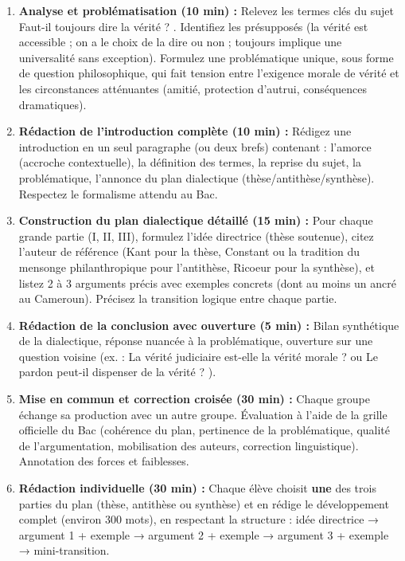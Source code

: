 \documentclass[11pt]{article}
\newcommand{\cle}[1]{{\popxbold\color{popdark}#1}}
\begin{document}
\begin{enumerate}
    \item \textbf{Analyse et problématisation (10 min) :} Relevez les termes clés du sujet \guillemotleft Faut-il toujours dire la vérité ? \guillemotright. Identifiez les présupposés (la vérité est accessible ; on a le choix de la dire ou non ; \guillemotleft toujours \guillemotright implique une universalité sans exception). Formulez une \cle{problématique} unique, sous forme de question philosophique, qui fait tension entre l'exigence morale de vérité et les circonstances atténuantes (amitié, protection d'autrui, conséquences dramatiques).
    \item \textbf{Rédaction de l'introduction complète (10 min) :} Rédigez une introduction \cle{en un seul paragraphe} (ou deux brefs) contenant : l'amorce (accroche contextuelle), la définition des termes, la reprise du sujet, la problématique, l'annonce du plan dialectique (thèse/antithèse/synthèse). Respectez le formalisme attendu au Bac.
    \item \textbf{Construction du plan dialectique détaillé (15 min) :} Pour chaque grande partie (I, II, III), formulez l'\cle{idée directrice} (thèse soutenue), citez l'\cle{auteur de référence} (Kant pour la thèse, Constant ou la tradition du \guillemotleft mensonge philanthropique \guillemotright pour l'antithèse, Ricoeur pour la synthèse), et listez 2 à 3 \cle{arguments} précis avec exemples concrets (dont au moins un ancré au Cameroun). Précisez la \cle{transition} logique entre chaque partie.
    \item \textbf{Rédaction de la conclusion avec ouverture (5 min) :} Bilan synthétique de la dialectique, réponse nuancée à la problématique, ouverture sur une question voisine (ex. : \guillemotleft La vérité judiciaire est-elle la vérité morale ? \guillemotright ou \guillemotleft Le pardon peut-il dispenser de la vérité ? \guillemotright).
    \item \textbf{Mise en commun et correction croisée (30 min) :} Chaque groupe échange sa production avec un autre groupe. Évaluation à l'aide de la \cle{grille officielle du Bac} (cohérence du plan, pertinence de la problématique, qualité de l'argumentation, mobilisation des auteurs, correction linguistique). Annotation des forces et faiblesses.
    \item \textbf{Rédaction individuelle (30 min) :} Chaque élève choisit \textbf{une} des trois parties du plan (thèse, antithèse ou synthèse) et en rédige le développement complet (environ 300 mots), en respectant la structure : idée directrice → argument 1 + exemple → argument 2 + exemple → argument 3 + exemple → mini-transition.
\end{enumerate}
\end{document}
